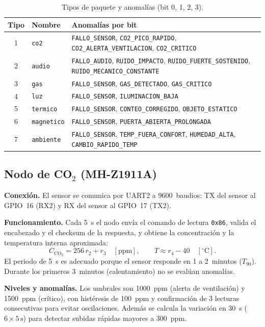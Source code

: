 \documentclass[11pt,a4paper]{article}
\begin{document}
\begin{table}[H]
\centering
\caption{Tipos de paquete y anomal\'ias (bit 0, 1, 2, 3).}
\small
\begin{tabularx}{\textwidth}{@{}clX@{}}
\toprule
\textbf{Tipo} & \textbf{Nombre} & \textbf{Anomal\'ias por bit} \\
\midrule
1 & \texttt{co2} & \texttt{FALLO\_SENSOR}, \texttt{CO2\_PICO\_RAPIDO}, \texttt{CO2\_ALERTA\_VENTILACION}, \texttt{CO2\_CRITICO} \\
2 & \texttt{audio} & \texttt{FALLO\_AUDIO}, \texttt{RUIDO\_IMPACTO}, \texttt{RUIDO\_FUERTE\_SOSTENIDO}, \texttt{RUIDO\_MECANICO\_CONSTANTE} \\
3 & \texttt{gas} & \texttt{FALLO\_SENSOR}, \texttt{GAS\_DETECTADO}, \texttt{GAS\_CRITICO} \\
4 & \texttt{luz} & \texttt{FALLO\_SENSOR}, \texttt{ILUMINACION\_BAJA} \\
5 & \texttt{termico} & \texttt{FALLO\_SENSOR}, \texttt{CONTEO\_CORREGIDO}, \texttt{OBJETO\_ESTATICO} \\
6 & \texttt{magnetico} & \texttt{FALLO\_SENSOR}, \texttt{PUERTA\_ABIERTA\_PROLONGADA} \\
7 & \texttt{ambiente} & \texttt{FALLO\_SENSOR}, \texttt{TEMP\_FUERA\_CONFORT}, \texttt{HUMEDAD\_ALTA}, \texttt{CAMBIO\_RAPIDO\_TEMP} \\
\bottomrule
\end{tabularx}
\end{table}

\subsection{Nodo de CO$_2$ (MH-Z1911A)}

\textbf{Conexi\'on.} El sensor se comunica por UART2 a 9600~baudios: TX del sensor al
GPIO~16 (RX2) y RX del sensor al GPIO~17 (TX2).

\textbf{Funcionamiento.} Cada 5~s el nodo env\'ia el comando de lectura \texttt{0x86},
valida el encabezado y el checksum de la respuesta, y obtiene la concentraci\'on y la
temperatura interna aproximada:
\begin{equation}
  C_{\text{CO}_2} = 256\,r_2 + r_3 \quad [\text{ppm}],
  \qquad T \approx r_4 - 40 \quad [^\circ\text{C}].
\end{equation}
El periodo de 5~s es adecuado porque el sensor responde en 1 a 2~minutos ($T_{90}$).
Durante los primeros 3~minutos (calentamiento) no se eval\'uan anomal\'ias.

\textbf{Niveles y anomal\'ias.} Los umbrales son 1000~ppm (alerta de ventilaci\'on) y
1500~ppm (cr\'itico), con hist\'eresis de 100~ppm y confirmaci\'on de 3 lecturas
consecutivas para evitar oscilaciones. Adem\'as se calcula la variaci\'on en 30~s
($6 \times 5\,\text{s}$) para detectar subidas r\'apidas mayores a 300~ppm.
\end{document}
